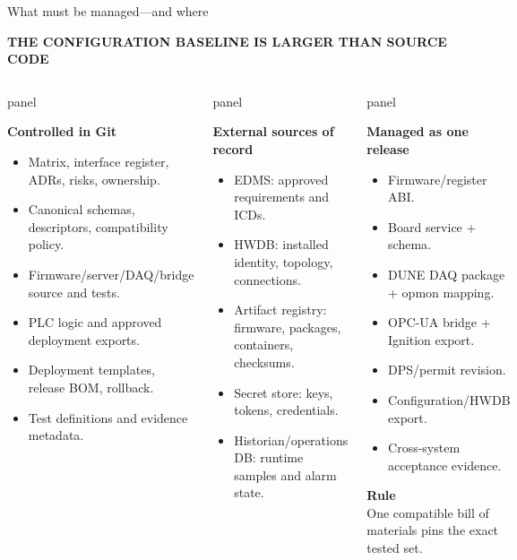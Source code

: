 \documentclass[aspectratio=169,10pt]{beamer}
\newcommand{\eyebrow}[1]{{\color{noircyan}\scriptsize\bfseries #1\par}}
\newcommand{\tightitem}{%
  \setlength{\itemsep}{0.8mm}%
  \setlength{\parskip}{0pt}%
}
\newcommand{\fixedpanel}[4][panel]{%
  \begin{beamercolorbox}[wd=\linewidth,sep=4pt,rounded=true]{#1}
    \begin{minipage}[t][#2][t]{\dimexpr\linewidth-8pt\relax}
      \raggedright
      {\usebeamercolor[fg]{#1}\bfseries #3\par}
      \vspace{0.45mm}
      {\usebeamercolor[fg]{#1}\footnotesize #4\par}
    \end{minipage}
  \end{beamercolorbox}
}
\begin{document}
\begin{frame}[t]{What must be managed---and where}
\eyebrow{THE CONFIGURATION BASELINE IS LARGER THAN SOURCE CODE}
\vspace{1.2mm}

\begin{columns}[T,onlytextwidth]
\fixedpanel{4.65cm}{Controlled in Git}{
\begin{itemize}\tightitem
  \item Matrix, interface register, ADRs, risks, ownership.
  \item Canonical schemas, descriptors, compatibility policy.
  \item Firmware/server/DAQ/bridge source and tests.
  \item PLC logic and approved deployment exports.
  \item Deployment templates, release BOM, rollback.
  \item Test definitions and evidence metadata.
\end{itemize}
}

\fixedpanel{4.65cm}{External sources of record}{
\begin{itemize}\tightitem
  \item EDMS: approved requirements and ICDs.
  \item HWDB: installed identity, topology, connections.
  \item Artifact registry: firmware, packages, containers, checksums.
  \item Secret store: keys, tokens, credentials.
  \item Historian/operations DB: runtime samples and alarm state.
\end{itemize}
}

\fixedpanel{4.65cm}{Managed as one release}{
\begin{itemize}\tightitem
  \item Firmware/register ABI.
  \item Board service + schema.
  \item DUNE DAQ package + opmon mapping.
  \item OPC-UA bridge + Ignition export.
  \item DPS/permit revision.
  \item Configuration/HWDB export.
  \item Cross-system acceptance evidence.
\end{itemize}
\vspace{1mm}
\textcolor{questionorange}{\bfseries Rule}\\
One compatible bill of materials pins the exact tested set.
}
\end{columns}
\end{frame}
\end{document}
